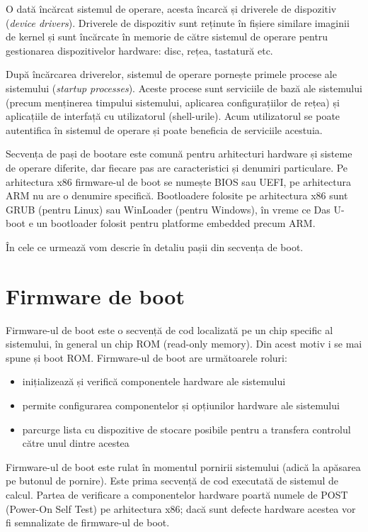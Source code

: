 O dată încărcat sistemul de operare, acesta încarcă și driverele de dispozitiv
(\textit{device drivers}).  Driverele de dispozitiv sunt reținute în fișiere similare
imaginii de kernel și sunt încărcate în memorie de către sistemul de operare
pentru gestionarea dispozitivelor hardware: disc, rețea, tastatură etc.

După încărcarea driverelor, sistemul de operare pornește primele procese ale
sistemului (\textit{startup processes}). Aceste procese sunt serviciile de bază ale
sistemului (precum menținerea timpului sistemului, aplicarea configurațiilor de
rețea) și aplicațiile de interfață cu utilizatorul (shell-urile). Acum
utilizatorul se poate autentifica în sistemul de operare și poate beneficia de
serviciile acestuia.

Secvența de pași de bootare este comună pentru arhitecturi hardware și sisteme
de operare diferite, dar fiecare pas are caracteristici și denumiri particulare.
Pe arhitectura x86 firmware-ul de boot se numește BIOS sau UEFI, pe arhitectura
ARM nu are o denumire specifică. Bootloadere folosite pe arhitectura x86 sunt
GRUB (pentru Linux) sau WinLoader (pentru Windows), în vreme ce Das U-boot e un
bootloader folosit pentru platforme embedded precum ARM.

În cele ce urmează vom descrie în detaliu pașii din secvența de boot.

\section{Firmware de boot}
\label{sec:boot-firmware}

Firmware-ul de boot este o secvență de cod localizată pe un chip specific al
sistemului, în general un chip ROM (read-only memory). Din acest motiv i se mai
spune și boot ROM. Firmware-ul de boot are următoarele roluri:


\begin{itemize}
	\item inițializează și verifică componentele hardware ale sistemului
	\item permite configurarea componentelor și opțiunilor hardware ale
		sistemului
	\item parcurge lista cu dispozitive de stocare posibile pentru a
		transfera controlul către unul dintre acestea
\end{itemize}

Firmware-ul de boot este rulat în momentul pornirii sistemului (adică la
apăsarea pe butonul de pornire). Este prima secvență de cod executată de
sistemul de calcul. Partea de verificare a componentelor hardware poartă numele
de POST (Power-On Self Test) pe arhitectura x86; dacă sunt defecte hardware
acestea vor fi semnalizate de firmware-ul de boot.


